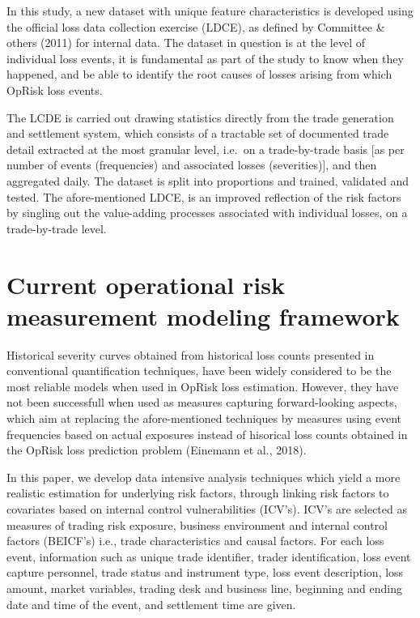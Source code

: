 \documentclass{DissertateUSU}
\begin{document}
In this study, a new dataset with unique feature characteristics is
developed using the official loss data collection exercise (LDCE), as
defined by Committee \& others (2011) for internal data. The dataset in
question is at the level of individual loss events, it is fundamental as
part of the study to know when they happened, and be able to identify
the root causes of losses arising from which OpRisk loss events.\medskip

The LCDE is carried out drawing statistics directly from the trade
generation and settlement system, which consists of a tractable set of
documented trade detail extracted at the most granular level, i.e.~on a
trade-by-trade basis {[}as per number of events (frequencies) and
associated losses (severities){]}, and then aggregated daily. The
dataset is split into proportions and trained, validated and tested. The
afore-mentioned LDCE, is an improved reflection of the risk factors by
singling out the value-adding processes associated with individual
losses, on a trade-by-trade level.

\section{Current operational risk measurement modeling framework}
\label{sec:Current operational risk measurement modeling framework}

Historical severity curves obtained from historical loss counts
presented in conventional quantification techniques, have been widely
considered to be the most reliable models when used in OpRisk loss
estimation. However, they have not been successfull when used as
measures capturing forward-looking aspects, which aim at replacing the
afore-mentioned techniques by measures using event frequencies based on
actual exposures instead of hisorical loss counts obtained in the OpRisk
loss prediction problem (Einemann et al., 2018).\medskip 

In this paper, we develop data intensive analysis techniques which yield
a more realistic estimation for underlying risk factors, through linking
risk factors to covariates based on internal control vulnerabilities
(ICV's). ICV's are selected as measures of trading risk exposure,
business environment and internal control factors (BEICF's) i.e., trade
characteristics and causal factors. For each loss event, information
such as unique trade identifier, trader identification, loss event
capture personnel, trade status and instrument type, loss event
description, loss amount, market variables, trading desk and business
line, beginning and ending date and time of the event, and settlement
time are given.\medskip  
\end{document}
